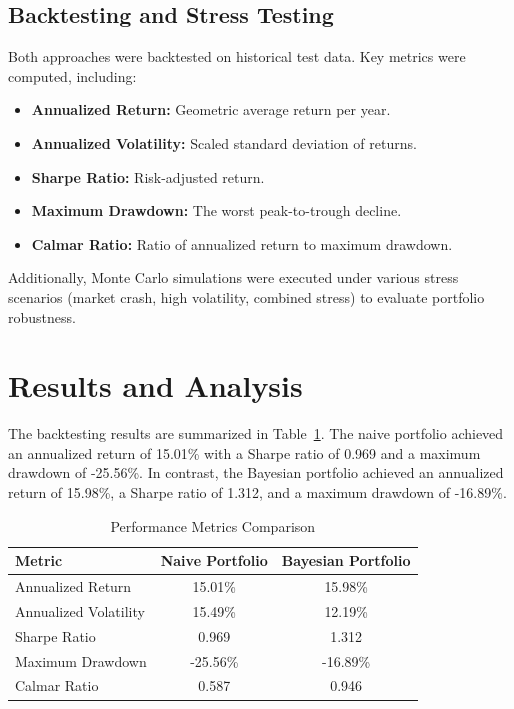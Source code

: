 \documentclass[a4paper,12pt]{article}
\begin{document}
\subsection{Backtesting and Stress Testing}
Both approaches were backtested on historical test data. Key metrics were computed, including:
\begin{itemize}
    \item \textbf{Annualized Return:} Geometric average return per year.
    \item \textbf{Annualized Volatility:} Scaled standard deviation of returns.
    \item \textbf{Sharpe Ratio:} Risk-adjusted return.
    \item \textbf{Maximum Drawdown:} The worst peak-to-trough decline.
    \item \textbf{Calmar Ratio:} Ratio of annualized return to maximum drawdown.
\end{itemize}
Additionally, Monte Carlo simulations were executed under various stress scenarios (market crash, high volatility, combined stress) to evaluate portfolio robustness.

\section{Results and Analysis}
The backtesting results are summarized in Table~\ref{tab:metrics}. The naive portfolio achieved an annualized return of 15.01\% with a Sharpe ratio of 0.969 and a maximum drawdown of -25.56\%. In contrast, the Bayesian portfolio achieved an annualized return of 15.98\%, a Sharpe ratio of 1.312, and a maximum drawdown of -16.89\%.

\begin{table}[H]
\centering
\caption{Performance Metrics Comparison}
\label{tab:metrics}
\begin{tabular}{@{}lcc@{}}
\toprule
\textbf{Metric} & \textbf{Naive Portfolio} & \textbf{Bayesian Portfolio} \\ \midrule
Annualized Return & 15.01\% & 15.98\% \\
Annualized Volatility & 15.49\% & 12.19\% \\
Sharpe Ratio & 0.969 & 1.312 \\
Maximum Drawdown & -25.56\% & -16.89\% \\
Calmar Ratio & 0.587 & 0.946 \\
\bottomrule
\end{tabular}
\end{table}
\end{document}
